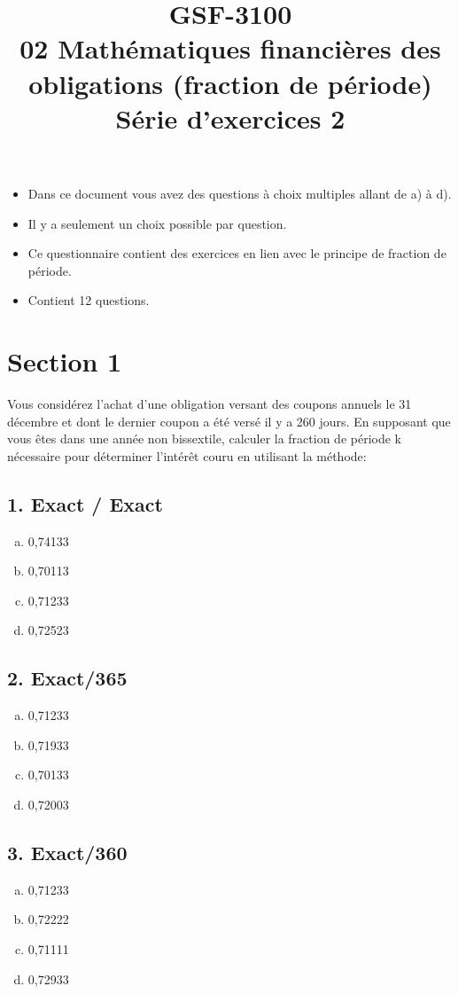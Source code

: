 \documentclass[10pt,a4paper]{article}
\title{GSF-3100 \\
02 Mathématiques financières des obligations (fraction de période) \\
Série d'exercices 2}
\begin{document}
\maketitle

\begin{itemize}
\item Dans ce document vous avez des questions à choix multiples allant de a) à d).  
\item Il y a seulement un choix possible par question.
\item Ce questionnaire contient des exercices en lien avec le principe de fraction de période.
\item Contient 12 questions. 
\end{itemize}
 

\newpage

\section*{Section 1}
Vous considérez l’achat d’une obligation versant des coupons annuels le 31 décembre et dont le dernier coupon a été versé il y a 260 jours.  En supposant que vous êtes dans une année non bissextile, calculer la fraction de période k nécessaire pour déterminer l’intérêt couru en utilisant la méthode:

\subsection*{1.  Exact / Exact} 
\begin{enumerate}[a)]
\item 0,74133
\item 0,70113
\item 0,71233
\item 0,72523
\end{enumerate}

\subsection*{2.  Exact/365} 
\begin{enumerate}[a)]
\item 0,71233
\item 0,71933
\item 0,70133
\item 0,72003
\end{enumerate}

\subsection*{3. Exact/360}
\begin{enumerate}[a)]
\item 0,71233
\item 0,72222
\item 0,71111
\item 0,72933
\end{enumerate}
\end{document}

